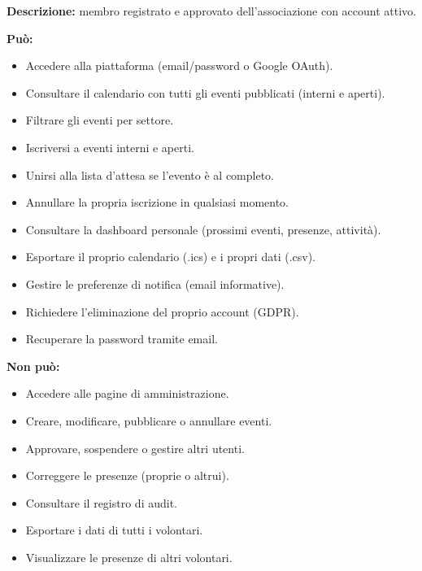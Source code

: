 \documentclass[a4paper,11pt,oneside]{book}
\begin{document}
\begin{tcolorbox}[
  enhanced,
  colback=namoLightCyan,
  colframe=namoCyan,
  coltitle=white,
  fonttitle=\bfseries\large,
  title={Scheda rapida --- Volontario},
  left=8pt, right=8pt, top=8pt, bottom=8pt,
  arc=6pt,
  boxrule=1pt,
]

\textbf{Descrizione:} membro registrato e approvato dell'associazione con account attivo.

\vspace{0.5em}
\textbf{Pu\`o:}
\begin{itemize}[leftmargin=1.5em, topsep=2pt, itemsep=2pt]
  \item Accedere alla piattaforma (email/password o Google OAuth).
  \item Consultare il calendario con tutti gli eventi pubblicati (interni e aperti).
  \item Filtrare gli eventi per settore.
  \item Iscriversi a eventi interni e aperti.
  \item Unirsi alla lista d'attesa se l'evento \`e al completo.
  \item Annullare la propria iscrizione in qualsiasi momento.
  \item Consultare la dashboard personale (prossimi eventi, presenze, attivit\`a).
  \item Esportare il proprio calendario (.ics) e i propri dati (.csv).
  \item Gestire le preferenze di notifica (email informative).
  \item Richiedere l'eliminazione del proprio account (GDPR).
  \item Recuperare la password tramite email.
\end{itemize}

\vspace{0.5em}
\textbf{Non pu\`o:}
\begin{itemize}[leftmargin=1.5em, topsep=2pt, itemsep=2pt]
  \item Accedere alle pagine di amministrazione.
  \item Creare, modificare, pubblicare o annullare eventi.
  \item Approvare, sospendere o gestire altri utenti.
  \item Correggere le presenze (proprie o altrui).
  \item Consultare il registro di audit.
  \item Esportare i dati di tutti i volontari.
  \item Visualizzare le presenze di altri volontari.
\end{itemize}


\end{tcolorbox}
\end{document}
